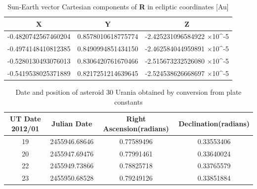 \documentclass[letterpaper,12pt]{article}
\begin{document}
\FloatBarrier
\begin{table}[h!]
\caption{Sun-Earth vector Cartesian components of {\bf R} in ecliptic coordinates [Au]} %
\centering %
\begin{tabular}{| c | c | c |} %
\hline %
X & Y & Z \\ [0.5ex] %
\hline %
-0.4820742567460204  & 0.8578010618775774  &  -2.425231096584922 \begin{math} \times \end{math}10^{-5} \\ \hline
-0.4974148410812385  & 0.8490994851434150  &  -2.462584044959891 \begin{math} \times \end{math}10^{-5} \\ \hline
-0.5280130493076013  & 0.8306420761670466  &  -2.515673232526080 \begin{math} \times \end{math}10^{-5} \\  \hline
-0.5419538025371889  & 0.8217251214639645  &  -2.524538626668697 \begin{math} \times \end{math}10^{-5}  \\ [1ex] %
\hline %
\end{tabular}
\label{table:nonlin} %
\end{table}
\FloatBarrier


\FloatBarrier
\begin{table}[h!]
\caption{Date and position of asteroid 30 Urania obtained by conversion from plate constants} %
\centering %
\begin{tabular}{| c | c | c | c |} %
\hline %
UT Date 2012/01 & Julian Date & Right Ascension(radians) & Declination(radians) \\ [0.5ex] %
\hline %
19   &   2455946.68646  & 0.77589496  &  0.33553406  \\ \hline
20   &   2455947.69476  & 0.77991461  &  0.33640024  \\ \hline
22   &   2455949.73866 &  0.78825718 &   0.33765579  \\  \hline
23   &   2455950.68528  & 0.79249126 &   0.33851884  \\ [1ex] %
\hline %
\end{tabular}
\label{table:nonlin} %
\end{table}
\FloatBarrier
\end{document}
